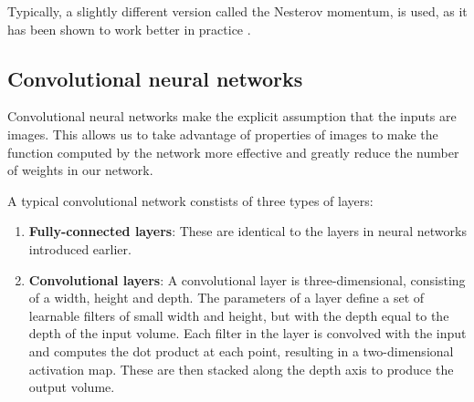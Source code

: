 \documentclass[12pt,a4paper,twoside,openright]{report}
\begin{document}
Typically, a slightly different version called the Nesterov momentum, is used, as it has been shown to work better in practice \cite{nesterov_momentum}.

\subsection{Convolutional neural networks}
Convolutional neural networks make the explicit assumption that the inputs are images. This allows us to take advantage of properties of images to make the function computed by the network more effective and greatly reduce the number of weights in our network. 

A typical convolutional network constists of three types of layers:
\begin{enumerate}
	\item \textbf{Fully-connected layers}: These are identical to the layers in  neural networks introduced earlier.
	\item \textbf{Convolutional layers}: A convolutional layer is three-dimensional, consisting of a width, height and depth. The parameters of a layer define a set of learnable filters of small width and height, but with the depth equal to the depth of the input volume. Each filter in the layer is convolved with the input and computes the dot product at each point, resulting in a two-dimensional activation map. These are then stacked along the depth axis to produce the output volume.
	

\end{enumerate}
\end{document}
